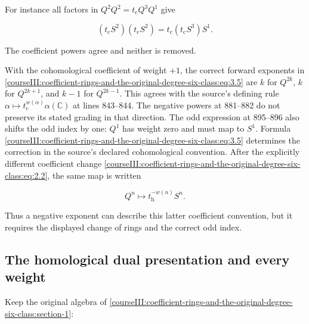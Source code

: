For instance all factors in \(Q^2Q^2=t_{\mathrm c}Q^3Q^1\) give

\begin{equation}
(t_{\mathrm c}S^2)(t_{\mathrm c}S^2)
       =t_{\mathrm c}(t_{\mathrm c}S^3)S^1.
 \label{courseIII:coefficient-rings-and-the-original-degree-six-class:eq:3.7}
\end{equation}

The coefficient powers agree and neither is removed.

With the cohomological coefficient of weight \(+1\), the correct forward exponents in \eqref{courseIII:coefficient-rings-and-the-original-degree-six-class:eq:3.5} are \(k\) for \(Q^{2k}\), \(k\) for \(Q^{2k+1}\), and \(k-1\) for \(Q^{2k-1}\). This agrees with the source's defining rule \(\alpha\mapsto t_{\mathrm c}^{w(\alpha)}\alpha(\mathbb C)\) at lines 843--844. The negative powers at 881--882 do not preserve its stated grading in that direction. The odd expression at 895--896 also shifts the odd index by one: \(Q^1\) has weight zero and must map to \(S^1\). Formula \eqref{courseIII:coefficient-rings-and-the-original-degree-six-class:eq:3.5} determines the correction in the source's declared cohomological convention. After the explicitly different coefficient change \eqref{courseIII:coefficient-rings-and-the-original-degree-six-class:eq:2.2}, the same map is written

\begin{equation}
Q^n\longmapsto t_{\mathrm h}^{-w(n)}S^n.
 \label{courseIII:coefficient-rings-and-the-original-degree-six-class:eq:3.8}
\end{equation}

Thus a negative exponent can describe this latter coefficient convention, but it requires the displayed change of rings and the correct odd index.

\label{courseIII:coefficient-rings-and-the-original-degree-six-class:coefficient-homological-maps}

\subsection{The homological dual presentation and every weight}
\label{courseIII:coefficient-rings-and-the-original-degree-six-class:section-4}

\label{courseIII:coefficient-rings:4}

Keep the original algebra of \cref{courseIII:coefficient-rings-and-the-original-degree-six-class:section-1}:

